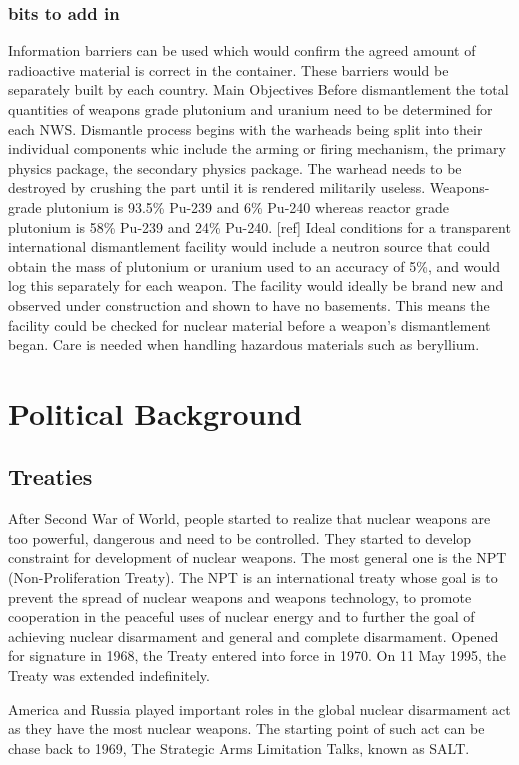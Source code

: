 \documentclass[twoside,titlepage,11pt,twocolumn,a4paper]{article}
\begin{document}
\subsubsection{bits to add in}
Information barriers can be used which would confirm the agreed amount
of radioactive material is correct in the container. These barriers
would be separately built by each country.  Main Objectives Before
dismantlement the total quantities of weapons grade plutonium and
uranium need to be determined for each NWS.  Dismantle process begins
with the warheads being split into their individual components whic
include the arming or firing mechanism, the primary physics package,
the secondary physics package.  The warhead needs to be destroyed by
crushing the part until it is rendered militarily useless.
Weapons-grade plutonium is 93.5\% Pu-239 and 6\% Pu-240 whereas
reactor grade plutonium is 58\% Pu-239 and 24\% Pu-240. [ref] Ideal
conditions for a transparent international dismantlement facility
would include a neutron source that could obtain the mass of plutonium
or uranium used to an accuracy of 5\%, and would log this separately
for each weapon.  The facility would ideally be brand new and observed
under construction and shown to have no basements. This means the
facility could be checked for nuclear material before a weapon’s
dismantlement began.  Care is needed when handling hazardous materials
such as beryllium.

\section{Political Background}
\subsection{Treaties}
After Second War of World, people started to realize that nuclear
weapons are too powerful, dangerous and need to be controlled. They
started to develop constraint for development of nuclear weapons.  The
most general one is the NPT (Non-Proliferation Treaty).\citep{unoda}
The NPT is an international treaty whose goal is to prevent the spread
of nuclear weapons and weapons technology, to promote cooperation in
the peaceful uses of nuclear energy and to further the goal of
achieving nuclear disarmament and general and complete disarmament.
Opened for signature in 1968, the Treaty entered into force in 1970.
On 11 May 1995, the Treaty was extended indefinitely.

America and Russia played important roles in the global nuclear
disarmament act as they have the most nuclear weapons. The starting
point of such act can be chase back to 1969, The Strategic Arms
Limitation Talks, known as SALT. 
\end{document}

